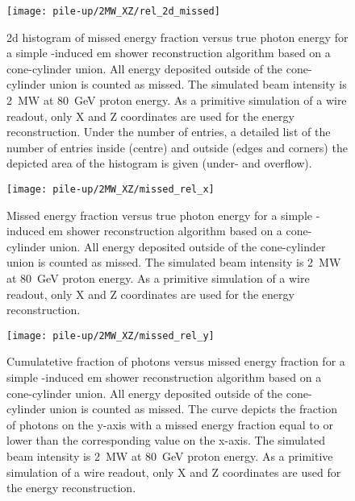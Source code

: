 \begin{figure}[htb]
	\centering
	\texttt{[image: pile-up/2MW\_XZ/rel\_2d\_missed]}
	\caption{\gls{2d} histogram of missed energy fraction versus true photon energy for a simple \Pgpz-induced \gls{em} shower reconstruction algorithm based on a cone-cylinder union.
		All energy deposited outside of the cone-cylinder union is counted as missed.
		The simulated beam intensity is \SI{2}{\mega\watt} at \SI{80}{\giga\electronvolt} proton energy.
		As a primitive simulation of a wire readout, only X and Z coordinates are used for the energy reconstruction.
		Under the number of entries, a detailed list of the number of entries inside (centre) and outside (edges and corners) the depicted area of the histogram is given (under- and overflow).}
\end{figure}

\begin{figure}[htb]
	\centering
	\texttt{[image: pile-up/2MW\_XZ/missed\_rel\_x]}
	\caption{Missed energy fraction versus true photon energy for a simple \Pgpz-induced \gls{em} shower reconstruction algorithm based on a cone-cylinder union.
		All energy deposited outside of the cone-cylinder union is counted as missed.
		The simulated beam intensity is \SI{2}{\mega\watt} at \SI{80}{\giga\electronvolt} proton energy.
		As a primitive simulation of a wire readout, only X and Z coordinates are used for the energy reconstruction.}
\end{figure}

\begin{figure}[htb]
	\centering
	\texttt{[image: pile-up/2MW\_XZ/missed\_rel\_y]}
	\caption{Cumulatetive fraction of photons versus missed energy fraction for a simple \Pgpz-induced \gls{em} shower reconstruction algorithm based on a cone-cylinder union.
		All energy deposited outside of the cone-cylinder union is counted as missed.
		The curve depicts the fraction of photons on the y-axis with a missed energy fraction equal to or lower than the corresponding value on the x-axis.
		The simulated beam intensity is \SI{2}{\mega\watt} at \SI{80}{\giga\electronvolt} proton energy.
		As a primitive simulation of a wire readout, only X and Z coordinates are used for the energy reconstruction.}
\end{figure}

